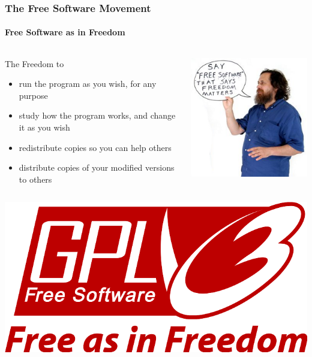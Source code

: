 \documentclass[unknownkeysallowed, 10pt, a4 paper, handout]{beamer}
\begin{document}
\begin{frame}[label=gnu]
  \frametitle{The Free Software Movement}
  \framesubtitle{Free Software as in Freedom}
  \begin{columns}[T]
    \begin{column}{.68\textwidth}
      \begin{block}{The Freedom to}
        \begin{itemize}
          \item run the program as you wish, for any purpose
          \item study how the program works, and change it as you wish
          \item redistribute copies so you can help others
          \item distribute copies of your modified versions to others
        \end{itemize}
      \end{block}
    \end{column}
    \hfill
    \begin{column}{.32\textwidth}
      \begin{flushright}
        \includegraphics[scale=0.35]{pics/rms1.png} \\
      \end{flushright}
    \end{column}
  \end{columns}
  \begin{center}
    \includegraphics[scale=0.25]{pics/GPL.png}
  \end{center}
\end{frame}
\end{document}
